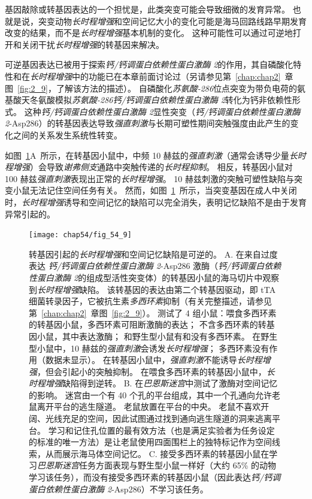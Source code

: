 基因敲除或转基因表达的一个担忧是，此类突变可能会导致细微的发育异常。
也就是说，突变动物\textit{长时程增强}和空间记忆大小的变化可能是海马回路线路早期发育改变的结果，而不是\textit{长时程增强}基本机制的变化。
这种可能性可以通过可逆地打开和关闭干扰\textit{长时程增强}的转基因来解决。


可逆基因表达已被用于探索\textit{钙/钙调蛋白依赖性蛋白激酶 2}的作用，其自磷酸化特性和在\textit{长时程增强}中的功能已在本章前面讨论过（另请参见第~\ref{chap:chap2}~章图~\ref{fig:2_9}，了解该方法的描述）。
自磷酸化\textit{苏氨酸-286}位点突变为带负电荷的氨基酸天冬氨酸模拟\textit{苏氨酸-286}\textit{钙/钙调蛋白依赖性蛋白激酶 2}转化为钙非依赖性形式。
这种\textit{钙/钙调蛋白依赖性蛋白激酶 2}显性突变（\textit{钙/钙调蛋白依赖性蛋白激酶 2}-Asp286）的转基因表达导致\textit{强直刺激}与长期可塑性期间突触强度由此产生的变化之间的关系发生系统性转变。


如图~\ref{fig:54_9}A~所示，在转基因小鼠中，中频 10 赫兹的\textit{强直刺激}（通常会诱导少量\textit{长时程增强}）会导致\textit{谢弗侧支}通路中突触传递的\textit{长时程抑制}。
相反，转基因小鼠对 100 赫兹\textit{强直刺激}表现出正常的\textit{长时程增强}。
10 赫兹刺激的突触可塑性缺陷与突变小鼠无法记住空间任务有关。
然而，如图~\ref{fig:54_9}~所示，当突变基因在成人中关闭时，\textit{长时程增强}诱导和空间记忆的缺陷可以完全消失，表明记忆缺陷不是由于发育异常引起的。


\begin{figure}[htbp]
	\centering
	\texttt{[image: chap54/fig\_54\_9]}
	\caption{转基因引起的\textit{长时程增强}和空间记忆缺陷是可逆的。
		A. 在来自过度表达 \textit{钙/钙调蛋白依赖性蛋白激酶 2}-Asp286 激酶（\textit{钙/钙调蛋白依赖性蛋白激酶 2}的组成型活性突变体）的转基因小鼠的海马切片中观察到\textit{长时程增强}缺陷。
		该转基因的表达由第二个转基因驱动，即 tTA 细菌转录因子，它被抗生素\textit{多西环素}抑制（有关完整描述，请参见第~\ref{chap:chap2}~章图~\ref{fig:2_9}）。
		测试了 4 组小鼠：喂食多西环素的转基因小鼠，多西环素可阻断激酶的表达；
		不含多西环素的转基因小鼠，其中表达激酶；
		和野生型小鼠有和没有多西环素。
		在野生型小鼠中，10 赫兹的\textit{强直刺激}会诱发\textit{长时程增强}；
		多西环素没有作用（数据未显示）。
		在转基因小鼠中，\textit{强直刺激}不能诱导\textit{长时程增强}，但会引起小的突触抑制。
		在喂食多西环素的转基因小鼠中，\textit{长时程增强}缺陷得到逆转。
		B. 在\textit{巴恩斯迷宫}中测试了激酶对空间记忆的影响。
		迷宫由一个有 40 个孔的平台组成，其中一个孔通向允许老鼠离开平台的逃生隧道。
		老鼠放置在平台的中央。
		老鼠不喜欢开阔、光线充足的空间，因此试图通过找到通向逃生隧道的洞来逃离平台。
		学习和记住孔位置的最有效方法（也是满足实验者为任务设定的标准的唯一方法）是让老鼠使用四面围栏上的独特标记作为空间线索，从而展示海马体空间记忆。
		C. 接受多西环素的转基因小鼠在学习\textit{巴恩斯迷宫}任务方面表现与野生型小鼠一样好（大约 65\% 的动物学习该任务），而没有接受多西环素的转基因小鼠（因此表达\textit{钙/钙调蛋白依赖性蛋白激酶 2}-Asp286）不学习该任务。}
	\label{fig:54_9}
\end{figure}


